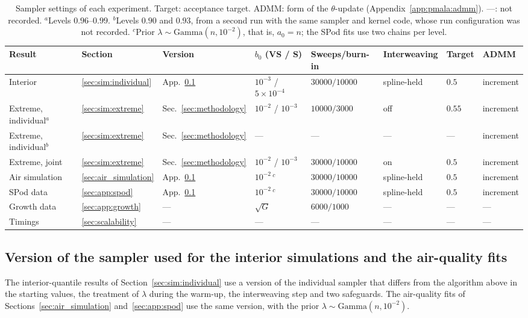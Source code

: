 \begin{table}[htbp]
\centering
\footnotesize
\caption{Sampler settings of each experiment. Target: acceptance target. ADMM: form of the $\theta$-update (Appendix~\ref{app:pmala:admm}). ---: not recorded. $^{a}$Levels $0.96$--$0.99$. $^{b}$Levels $0.90$ and $0.93$, from a second run with the same sampler and kernel code, whose run configuration was not recorded. $^{c}$Prior $\lambda\sim\mathrm{Gamma}(n, 10^{-2})$, that is, $a_0 = n$; the SPod fits use two chains per level.}
\label{tab:pmala_settings}
\setlength{\tabcolsep}{2.5pt}
\begin{tabular}{@{}llllllll@{}}
\toprule
Result & Section & Version & $b_0$ (VS / S) & Sweeps/burn-in & Interweaving & Target & ADMM \\
\midrule
Interior & \ref{sec:sim:individual} & App.~\ref{app:pmala:interior} & $10^{-3}$ / $5\times10^{-4}$ & $30000/10000$ & spline-held & $0.5$ & increment \\
Extreme, individual$^{a}$ & \ref{sec:sim:extreme} & Sec.~\ref{sec:methodology} & $10^{-2}$ / $10^{-3}$ & $10000/3000$ & off & $0.55$ & increment \\
Extreme, individual$^{b}$ & \ref{sec:sim:extreme} & Sec.~\ref{sec:methodology} & --- & --- & --- & --- & increment \\
Extreme, joint & \ref{sec:sim:extreme} & Sec.~\ref{sec:methodology} & $10^{-2}$ / $10^{-3}$ & $30000/10000$ & on & $0.5$ & increment \\
Air simulation & \ref{sec:air_simulation} & App.~\ref{app:pmala:interior} & $10^{-2}$\,$^{c}$ & $30000/10000$ & spline-held & $0.5$ & increment \\
SPod data & \ref{sec:app:spod} & App.~\ref{app:pmala:interior} & $10^{-2}$\,$^{c}$ & $30000/10000$ & spline-held & $0.5$ & increment \\
Growth data & \ref{sec:app:growth} & --- & $\sqrt{G}$ & $6000/1000$ & --- & --- & --- \\
Timings & \ref{sec:scalability} & --- & --- & --- & --- & --- & --- \\
\bottomrule
\end{tabular}
\end{table}

\subsection{Version of the sampler used for the interior simulations and the air-quality fits}
\label{app:pmala:interior}

The interior-quantile results of Section~\ref{sec:sim:individual} use a version of the individual sampler that differs from the algorithm above in the starting values, the treatment of $\lambda$ during the warm-up, the interweaving step and two safeguards. The air-quality fits of Sections~\ref{sec:air_simulation} and~\ref{sec:app:spod} use the same version, with the prior $\lambda\sim\mathrm{Gamma}(n, 10^{-2})$.

